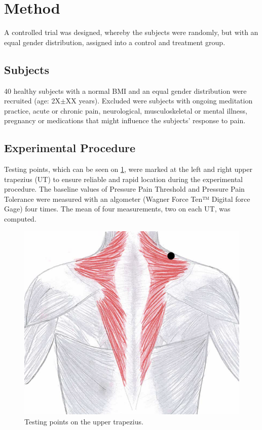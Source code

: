 \section{Method}
A controlled trial was designed, whereby the subjects were randomly, but with an equal gender distribution, assigned into a control and treatment group.

\subsection{Subjects}
40 healthy subjects with a normal BMI and an equal gender distribution were recruited (age: 2X$\pm$XX years). 
Excluded were subjects with ongoing meditation practice, acute or chronic pain, neurological, musculoskeletal or mental illness, pregnancy or medications that might influence the subjects’ response to pain.

\subsection{Experimental Procedure}
Testing points, which can be seen on \ref{fig:trapezius}, were marked at the left and right upper trapezius (UT) to ensure reliable and rapid location during the experimental procedure. The baseline values of Pressure Pain Threshold and Pressure Pain Tolerance were measured with an algometer (Wagner Force Ten™ Digital force Gage) four times.  The mean of four measurements, two on each UT, was computed. 

\begin{figure}[H]
\centering
\includegraphics[width=.7\columnwidth]{../figures/trapezius}
\caption{Testing points on the upper trapezius.}
\label{fig:trapezius}
\end{figure} \vspace{-.5cm}

